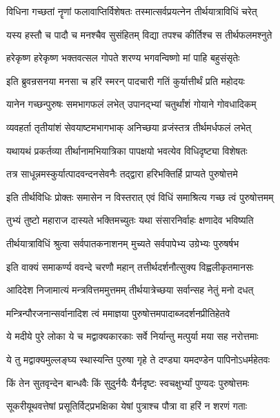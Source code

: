 \twolineshloka
{विधिना गच्छतां नॄणां फलावाप्तिर्विशेषतः}
{तस्मात्सर्वप्रयत्नेन तीर्थयात्राविधिं चरेत्}%

\twolineshloka
{यस्य हस्तौ च पादौ च मनश्चैव सुसंहितम्}
{विद्या तपश्च कीर्तिश्च स तीर्थफलमश्नुते}%

\twolineshloka
{हरेकृष्ण हरेकृष्ण भक्तवत्सल गोपते}
{शरण्य भगवन्विष्णो मां पाहि बहुसंसृतेः}%

\twolineshloka
{इति ब्रुवन्रसनया मनसा च हरिं स्मरन्}
{पादचारी गतिं कुर्यात्तीर्थं प्रति महोदयः}%

\twolineshloka
{यानेन गच्छन्पुरुषः समभागफलं लभेत्}
{उपानद्भ्यां चतुर्थांशं गोयाने गोवधादिकम्}%

\twolineshloka
{व्यवहर्ता तृतीयांशं सेवयाष्टमभागभाक्}
{अनिच्छया व्रजंस्तत्र तीर्थमर्धफलं लभेत्}%

\twolineshloka
{यथायथं प्रकर्तव्या तीर्थानामभियात्रिका}
{पापक्षयो भवत्येव विधिदृष्ट्या विशेषतः}%

\twolineshloka
{तत्र साधून्नमस्कुर्यात्पादवन्दनसेवनैः}
{तद्द्वारा हरिभक्तिर्हि प्राप्यते पुरुषोत्तमे}%

\twolineshloka
{इति तीर्थविधिः प्रोक्तः समासेन न विस्तरात्}
{एवं विधिं समाश्रित्य गच्छ त्वं पुरुषोत्तमम्}%

\twolineshloka
{तुभ्यं तुष्टो महाराज दास्यते भक्तिमच्युतः}
{यथा संसारनिर्वाहः क्षणादेव भविष्यति}%

\twolineshloka
{तीर्थयात्राविधिं श्रुत्वा सर्वपातकनाशनम्}
{मुच्यते सर्वपापेभ्य उग्रेभ्यः पुरुषर्षभ}%


\twolineshloka
{इति वाक्यं समाकर्ण्य ववन्दे चरणौ महान्}
{तत्तीर्थदर्शनौत्सुक्य विह्वलीकृतमानसः}%

\twolineshloka
{आदिदेश निजामात्यं मन्त्रवित्तममुत्तमम्}
{तीर्थयात्रेच्छया सर्वान्सह नेतुं मनो दधत्}%

\twolineshloka
{मन्त्रिन्पौरजनान्सर्वानादिश त्वं ममाज्ञया}
{पुरुषोत्तमपादाब्जदर्शनप्रीतिहेतवे}%

\twolineshloka
{ये मदीये पुरे लोका ये च मद्वाक्यकारकाः}
{सर्वे निर्यान्तु मत्पुर्या मया सह नरोत्तमाः}%

\twolineshloka
{ये तु मद्वाक्यमुल्लङ्घ्य स्थास्यन्ति पुरुषा गृहे}
{ते दण्ड्या यमदण्डेन पापिनोऽधर्महेतवः}%

\twolineshloka
{किं तेन सुतवृन्देन बान्धवैः किं सुदुर्नयैः}
{यैर्नदृष्टः स्वचक्षुर्भ्यां पुण्यदः पुरुषोत्तमः}%

\twolineshloka
{सूकरीयूथवत्तेषां प्रसूतिर्विट्प्रभक्षिका}
{येषां पुत्राश्च पौत्रा वा हरिं न शरणं गताः}%

